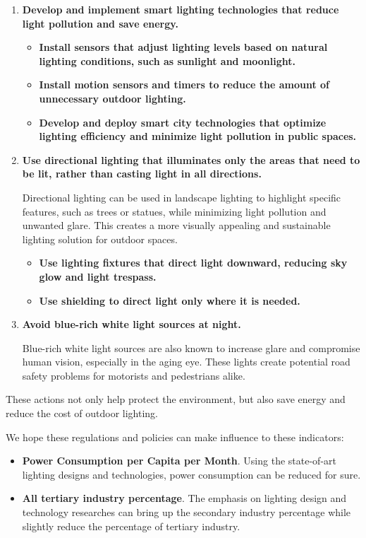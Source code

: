 \begin{enumerate}
    
    \item \textbf{Develop and implement smart lighting technologies that reduce light pollution and save energy.}
    \begin{itemize}
        \item \textbf{Install sensors that adjust lighting levels based on natural lighting conditions, such as sunlight and moonlight. }
        \item \textbf{Install motion sensors and timers to reduce the amount of unnecessary outdoor lighting.}
        \item \textbf{Develop and deploy smart city technologies that optimize lighting efficiency and minimize light pollution in public spaces.}
    \end{itemize}

    \item \textbf{Use directional lighting that illuminates only the areas that need to be lit, rather than casting light in all directions.}

    Directional lighting can be used in landscape lighting to highlight specific features, such as trees or statues, while minimizing light pollution and unwanted glare. This creates a more visually appealing and sustainable lighting solution for outdoor spaces.

    \begin{itemize}
        \item \textbf{Use lighting fixtures that direct light downward, reducing sky glow and light trespass.}
        \item \textbf{Use shielding to direct light only where it is needed.}
    \end{itemize}

    \item \textbf{Avoid blue-rich white light sources at night. }

    Blue-rich white light sources are also known to increase glare and compromise human vision, especially in the aging eye. These lights create potential road safety problems for motorists and pedestrians alike.

\end{enumerate}

These actions not only help protect the environment, but also save energy and reduce the cost of outdoor lighting.

We hope these regulations and policies can make influence to these indicators:
\begin{itemize}
    \item \textbf{Power Consumption per Capita per Month}. Using the state-of-art lighting designs and technologies, power consumption can be reduced for sure.
    \item \textbf{All tertiary industry percentage}. The emphasis on lighting design and technology researches can bring up the secondary industry percentage while slightly reduce the percentage of tertiary industry.
\end{itemize}

